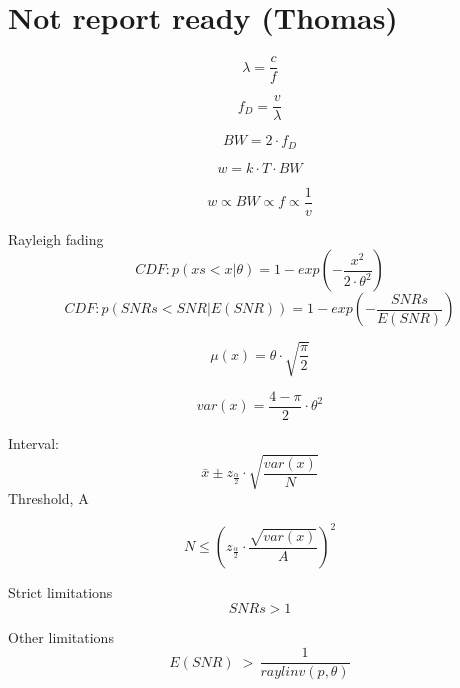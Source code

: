\section{Not report ready (Thomas)}
\begin{equation}
\lambda = \frac{c}{f}
\end{equation}

\begin{equation}
f_D=\frac{v}{\lambda}
\end{equation}

\begin{equation}
BW = 2\cdot f_D
\end{equation}

\begin{equation}
w = k \cdot T \cdot BW
\end{equation}


\begin{equation}
w \propto BW \propto f \propto \frac{1}{v}
\end{equation}


Rayleigh fading
\begin{equation}
CDF: p(xs < x | \theta) = 1-exp\left(-\frac{x^2}{2\cdot \theta^2}\right)
\end{equation}
\begin{equation}
CDF: p(SNRs < SNR | E\left(SNR\right)) = 1-exp\left(-\frac{SNRs}{E\left(SNR\right)}\right)
\end{equation}

\begin{equation}
\mu(x) = \theta\cdot\sqrt{\frac{\pi}{2}}
\end{equation}

\begin{equation}
var(x) = \frac{4-\pi}{2}\cdot \theta^2
\end{equation}

Interval:
\begin{equation}
\bar{x} \pm z_{\frac{\alpha}{2}} \cdot \sqrt{\frac{var(x)}{N}}
\end{equation}
Threshold, A

\begin{equation}
N \leq \left(z_{\frac{\alpha}{2}} \cdot \frac{\sqrt{var(x)}}{A} \right)^2
\end{equation}

Strict limitations
\begin{equation}
SNRs > 1
\end{equation}

Other limitations
\begin{equation}
E\left(SNR\right) \;>\, \frac{1}{raylinv(p,\theta)} 
\end{equation}


